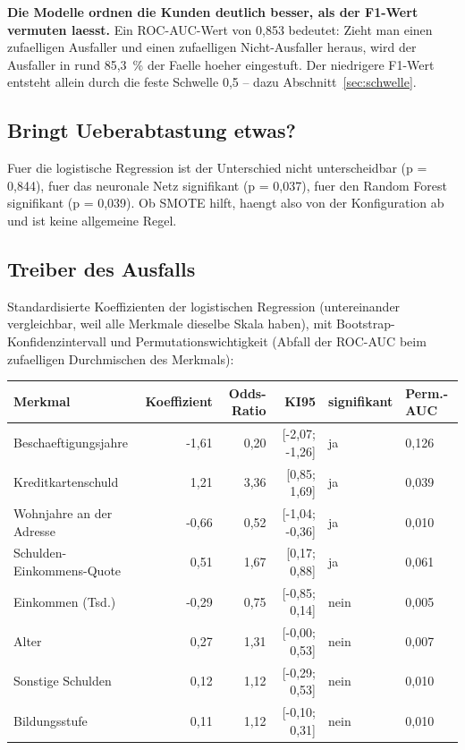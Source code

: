 \textbf{Die Modelle ordnen die Kunden deutlich besser, als der F1-Wert
vermuten laesst.} Ein ROC-AUC-Wert von 0,853 bedeutet:
Zieht man einen zufaelligen Ausfaller und einen zufaelligen Nicht-Ausfaller
heraus, wird der Ausfaller in rund 85,3~\% der
Faelle hoeher eingestuft. Der niedrigere F1-Wert entsteht allein durch die
feste Schwelle 0,5 -- dazu Abschnitt~\ref{sec:schwelle}.

\subsection{Bringt Ueberabtastung etwas?}

Fuer die logistische Regression ist der Unterschied nicht unterscheidbar (p = 0,844),
fuer das neuronale Netz signifikant (p = 0,037),
fuer den Random Forest signifikant (p = 0,039).
Ob SMOTE hilft, haengt also von der Konfiguration ab und ist keine allgemeine
Regel.

\subsection{Treiber des Ausfalls}

Standardisierte Koeffizienten der logistischen Regression (untereinander
vergleichbar, weil alle Merkmale dieselbe Skala haben), mit
Bootstrap-Konfidenzintervall und Permutationswichtigkeit (Abfall der ROC-AUC
beim zufaelligen Durchmischen des Merkmals):

\begin{table}[H]
  \centering
  \footnotesize
  \begin{tabular}{lrrrll}
    \toprule
    Merkmal & Koeffizient & Odds-Ratio & KI95 & signifikant & Perm.-AUC \\
    \midrule
    Beschaeftigungsjahre & -1,61 & 0,20 & [-2,07; -1,26] & ja & 0,126 \\
    Kreditkartenschuld & 1,21 & 3,36 & [0,85; 1,69] & ja & 0,039 \\
    Wohnjahre an der Adresse & -0,66 & 0,52 & [-1,04; -0,36] & ja & 0,010 \\
    Schulden-Einkommens-Quote & 0,51 & 1,67 & [0,17; 0,88] & ja & 0,061 \\
    Einkommen (Tsd.) & -0,29 & 0,75 & [-0,85; 0,14] & nein & 0,005 \\
    Alter & 0,27 & 1,31 & [-0,00; 0,53] & nein & 0,007 \\
    Sonstige Schulden & 0,12 & 1,12 & [-0,29; 0,53] & nein & 0,010 \\
    Bildungsstufe & 0,11 & 1,12 & [-0,10; 0,31] & nein & 0,010 \\
    \bottomrule
  \end{tabular}
\end{table}



